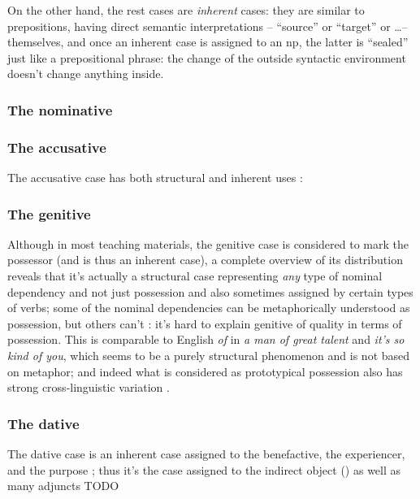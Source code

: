 \documentclass[a4paper, oneside]{report}
\newcommand*{\citepage}[1]{p.~{#1}}
\newcommand*{\citepages}[1]{pp.~{#1}}
\newcommand{\form}[1]{\emph{#1}}
\begin{document}
On the other hand, the rest cases are \emph{inherent} cases:
they are similar to prepositions, having direct semantic interpretations
-- ``source'' or ``target'' or \dots -- themselves,
and once an inherent case is assigned to an \acs{np},
the latter is ``sealed'' just like a prepositional phrase:
the change of the outside syntactic environment 
doesn't change anything inside.

\subsubsection{The nominative}

\subsubsection{The accusative}\label{sec:accusative-distribution}

The accusative case has both structural and inherent uses
\citep[\citepage{238}]{oniga2014latin}: 

\subsubsection{The genitive}\label{sec:genitive-distribution}

Although in most teaching materials, the genitive case is considered 
to mark the possessor (and is thus an inherent case), 
a complete overview of its distribution reveals that 
it's actually a structural case 
representing \emph{any} type of nominal dependency 
and not just possession 
and also sometimes assigned by certain types of verbs;
some of the nominal dependencies can be 
metaphorically understood as possession, 
but others can't \citep[\citepage{244}]{oniga2014latin}:
it's hard to explain genitive of quality 
in terms of possession.
This is comparable to English \form{of}
in \form{a man of great talent} and \form{it's so kind of you},
which seems to be a purely structural phenomenon
and is not based on metaphor;
and indeed what is considered as prototypical possession 
also has strong cross-linguistic variation 
\citep[\citepages{262-263}]{dixon2010basic2}.

\subsubsection{The dative}\label{sec:dative-distribution}

The dative case is an inherent case assigned to the benefactive, the experiencer, and the purpose
\citep[\citepage{251}]{oniga2014latin};
thus it's the case assigned to the indirect object ()
as well as many adjuncts TODO
\end{document}
